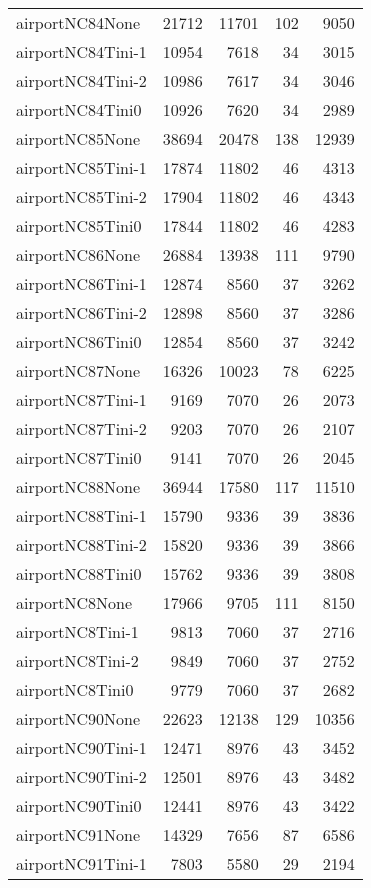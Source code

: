 \begin{longtable}{lrrrr}
airportNC84None & 21712 & 11701 & 102 & 9050 \\
airportNC84Tini-1 & 10954 & 7618 & 34 & 3015 \\
airportNC84Tini-2 & 10986 & 7617 & 34 & 3046 \\
airportNC84Tini0 & 10926 & 7620 & 34 & 2989 \\
airportNC85None & 38694 & 20478 & 138 & 12939 \\
airportNC85Tini-1 & 17874 & 11802 & 46 & 4313 \\
airportNC85Tini-2 & 17904 & 11802 & 46 & 4343 \\
airportNC85Tini0 & 17844 & 11802 & 46 & 4283 \\
airportNC86None & 26884 & 13938 & 111 & 9790 \\
airportNC86Tini-1 & 12874 & 8560 & 37 & 3262 \\
airportNC86Tini-2 & 12898 & 8560 & 37 & 3286 \\
airportNC86Tini0 & 12854 & 8560 & 37 & 3242 \\
airportNC87None & 16326 & 10023 & 78 & 6225 \\
airportNC87Tini-1 & 9169 & 7070 & 26 & 2073 \\
airportNC87Tini-2 & 9203 & 7070 & 26 & 2107 \\
airportNC87Tini0 & 9141 & 7070 & 26 & 2045 \\
airportNC88None & 36944 & 17580 & 117 & 11510 \\
airportNC88Tini-1 & 15790 & 9336 & 39 & 3836 \\
airportNC88Tini-2 & 15820 & 9336 & 39 & 3866 \\
airportNC88Tini0 & 15762 & 9336 & 39 & 3808 \\
airportNC8None & 17966 & 9705 & 111 & 8150 \\
airportNC8Tini-1 & 9813 & 7060 & 37 & 2716 \\
airportNC8Tini-2 & 9849 & 7060 & 37 & 2752 \\
airportNC8Tini0 & 9779 & 7060 & 37 & 2682 \\
airportNC90None & 22623 & 12138 & 129 & 10356 \\
airportNC90Tini-1 & 12471 & 8976 & 43 & 3452 \\
airportNC90Tini-2 & 12501 & 8976 & 43 & 3482 \\
airportNC90Tini0 & 12441 & 8976 & 43 & 3422 \\
airportNC91None & 14329 & 7656 & 87 & 6586 \\
airportNC91Tini-1 & 7803 & 5580 & 29 & 2194 \\

\end{longtable}
